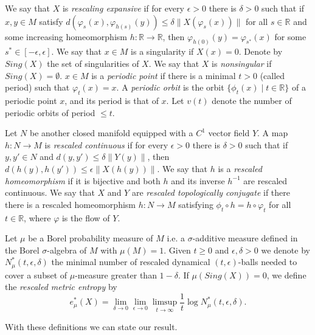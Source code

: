 \documentclass{amsart}
\newtheorem{prop}{Proposition}
\numberwithin{equation}{section}
\begin{document}
We say that $X$ is {\em rescaling expansive} \cite{wew} if for every $\epsilon>0$ there is $\delta>0$ such that if $x,y\in M$ satisfy
$d(\varphi_s(x),\varphi_{h(s)}(y))\leq\delta\|X(\varphi_s(x))\|$ for all $s\in\mathbb{R}$ and some increasing homeomorphism $h:\mathbb{R}\to\mathbb{R}$, then
$\varphi_{h(0)}(y)=\varphi_{s^*}(x)$ for some $s^*\in [-\epsilon,\epsilon]$.
We say that $x\in M$ is a singularity if $X(x)=0$.
Denote by $Sing(X)$ the set of singularities of $X$.
We say that $X$ is {\em nonsingular} if $Sing(X)=\emptyset$.
$x\in M$ is a {\em periodic point} if there is a minimal $t>0$ (called period) such that $\varphi_t(x)=x$.
A {\em periodic orbit} is the orbit $\{\phi_t(x)\mid t\in\mathbb{R}\}$ of a periodic point $x$, and its period is that of $x$.
Let $v(t)$ denote the number of periodic orbits of period $\leq t$.



Let $N$ be another closed manifold equipped with a $C^1$ vector field $Y$.
A map $h:N\to M$ is {\em rescaled continuous} if for every $\epsilon>0$ there is $\delta>0$ such that
if $y,y'\in N$ and $d(y,y')\leq \delta\|Y(y)\|$, then $d(h(y),h(y'))\leq \epsilon\|X(h(y))\|$.
We say that $h$ is a {\em rescaled homeomorphism} if it is bijective and both $h$ and its inverse $h^{-1}$ are rescaled continuous.
We say that $X$ and $Y$ are {\em rescaled topologically conjugate} if there there is a rescaled homeomorphism $h:N\to M$ satisfying
$\phi_t\circ h=h\circ \varphi_t$ for all $t\in\mathbb{R}$, where $\varphi$ is the flow of $Y$.

Let $\mu$ be a Borel probability measure of $M$ i.e. a $\sigma$-additive measure defined in the Borel $\sigma$-algebra of $M$ with $\mu(M)=1$.
Given $t\geq0$ and $\epsilon,\delta>0$ we
denote by $N^*_\mu(t,\epsilon,\delta)$ the minimal number of rescaled dynamical $(t,\epsilon)$-balls
needed to cover a subset of $\mu$-measure greater than $1-\delta$.
If $\mu(Sing(X))=0$, we define the {\em rescaled metric entropy} \cite{ww}
by
$$
e^*_\mu(X)=\lim_{\delta\to0}\lim_{\epsilon\to0}\limsup_{t\to\infty}\frac{1}t\log N_\mu^*(t,\epsilon,\delta).
$$







With these definitions we can state our result.
\end{document}

